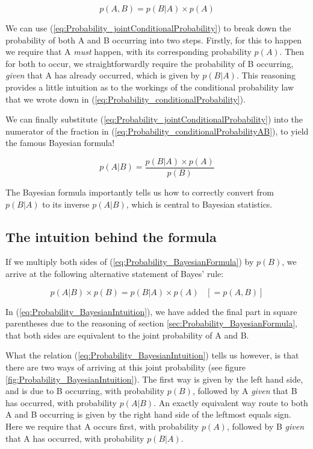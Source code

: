 \documentclass[11pt,fullpage]{book}
\begin{document}
\begin{equation}\label{eq:Probability_jointConditionalProbability}
p(A,B) = p(B|A)\times p(A)
\end{equation}

We can use (\ref{eq:Probability_jointConditionalProbability}) to break down the probability of both A and B occurring into two steps. Firstly, for this to happen we require that A \textit{must} happen, with its corresponding probability $p(A)$. Then for both to occur, we straightforwardly require the probability of B occurring, \textit{given} that A has already occurred, which is given by $p(B|A)$. This reasoning provides a little intuition as to the workings of the conditional probability law that we wrote down in (\ref{eq:Probability_conditionalProbability}).

We can finally substitute (\ref{eq:Probability_jointConditionalProbability}) into the numerator of the fraction in (\ref{eq:Probability_conditionalProbabilityAB}), to yield the famous Bayesian formula!

\begin{equation}\label{eq:Probability_BayesianFormula}
p(A|B) = \frac{p(B|A)\times p(A)}{p(B)}
\end{equation}

The Bayesian formula importantly tells us how to correctly convert from $p(B|A)$ to its inverse $p(A|B)$, which is central to Bayesian statistics.

\subsection{The intuition behind the formula}
If we multiply both sides of (\ref{eq:Probability_BayesianFormula}) by $p(B)$, we arrive at the following alternative statement of Bayes' rule:

\begin{equation}\label{eq:Probability_BayesianIntuition}
p(A|B)\times p(B) = p(B|A)\times p(A) \;\;\;[= p(A,B)]
\end{equation}

In (\ref{eq:Probability_BayesianIntuition}), we have added the final part in square parentheses due to the reasoning of section \ref{sec:Probability_BayesianFormula}, that both sides are equivalent to the joint probability of A and B.

What the relation (\ref{eq:Probability_BayesianIntuition}) tells us however, is that there are two ways of arriving at this joint probability (see figure \ref{fig:Probability_BayesianIntuition}). The first way is given by the left hand side, and is due to B occurring, with probability $p(B)$, followed by A \textit{given} that B has occurred, with probability $p(A|B)$. An exactly equivalent way route to both A and B occurring is given by the right hand side of the leftmost equals sign. Here we require that A occurs first, with probability $p(A)$, followed by B \textit{given} that A has occurred, with probability $p(B|A)$.
\end{document}

